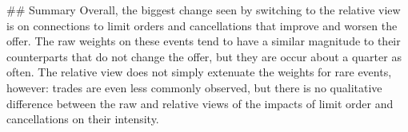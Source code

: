 		\#\# Summary
		Overall, the biggest change seen by switching to the relative view is on connections to limit orders and cancellations that improve and worsen the offer. The raw weights on these events tend to have a similar magnitude to their counterparts that do not change the offer, but they are occur about a quarter as often. The relative view does not simply extenuate the weights for rare events, however: trades are even less commonly observed, but there is no qualitative difference between the raw and relative views of the impacts of limit order and cancellations on their intensity.

